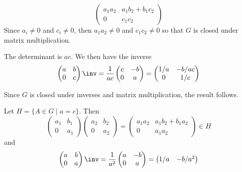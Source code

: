 \begin{problems}
\begin{solalph}
$$        \begin{pmatrix}
            a_1a_2 & a_1b_2 + b_1c_2 \\
            0 & c_1c_2
        \end{pmatrix}$$
        Since $a_i \neq 0$ and $c_i \neq 0$, then $a_1a_2 \neq 0$ and $c_1c_2 \neq 0$ so that $G$ is closed under matrix multiplication.
        \item The determinant is $ac$. We then have the inverse
        $$
        \begin{pmatrix}
            a & b \\
            0 & c
        \end{pmatrix}\inv = 
        \frac{1}{ac}
        \begin{pmatrix}
            c & -b \\
            0 & a
        \end{pmatrix} = 
        \begin{pmatrix}
            1/a & -b/ac \\
            0 & 1/c
        \end{pmatrix}$$
        \item Since $G$ is closed under inverses and matrix multiplication, the result follows.
        \item Let $H = \{A \in G \mid a = c\}$. Then
        $$
        \begin{pmatrix}
            a_1 & b_1 \\
            0 & a_1
        \end{pmatrix}
        \begin{pmatrix}
            a_2 & b_2 \\
            0 & a_2
        \end{pmatrix} = 
        \begin{pmatrix}
            a_1a_2 & a_1b_2 + b_1a_2 \\
            0 & a_1a_2
        \end{pmatrix} \in H$$
        and
        $$
        \begin{pmatrix}
            a & b \\
            0 & a
        \end{pmatrix}\inv = 
        \frac{1}{a^2}
        \begin{pmatrix}
            a & -b \\
            0 & a 
        \end{pmatrix} = 
        \begin{pmatrix}
            1/a & -b/a^2 \\

\end{pmatrix}$$
\end{solalph}
\end{problems}
